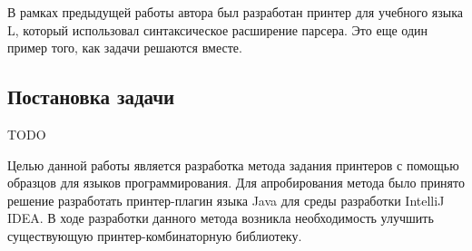 В рамках предыдущей работы автора \cite{myCoursePaper} был разработан принтер
для учебного языка L, который использовал синтаксическое расширение парсера.
Это еще один пример того, как задачи решаются вместе.

\subsection{Постановка задачи}

TODO

Целью данной работы является разработка метода задания принтеров с помощью
образцов для языков программирования. 
Для апробирования метода было принято решение разработать принтер-плагин
языка Java для среды разработки IntelliJ IDEA.
В ходе разработки данного метода возникла необходимость улучшить существующую
принтер-комбинаторную библиотеку\cite{swierstra}. 
